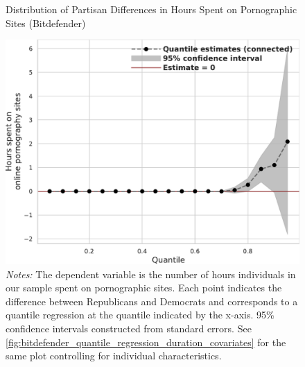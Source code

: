 \documentclass[12pt, letterpaper]{article}
\begin{document}
\begin{figure}[t]
	\centering
	\caption{Distribution of Partisan Differences in Hours Spent on Pornographic Sites (Bitdefender)}
	\includegraphics[width=.7\linewidth]{figs/bitdefender_quantile_reg_duration_adult.pdf}
	\caption*{\footnotesize \emph{Notes:} 
		The dependent variable is the number of hours individuals in our sample spent on pornographic sites.
		Each point indicates the difference between Republicans and Democrats and corresponds to a quantile regression at the quantile indicated by the x-axis.
		95\% confidence intervals constructed from standard errors.
		See \cref{fig:bitdefender_quantile_regression_duration_covariates} for the same plot controlling for individual characteristics.
	}
	\label{fig:bitdefender_quantile_regression_duration}
\end{figure}
\end{document}
